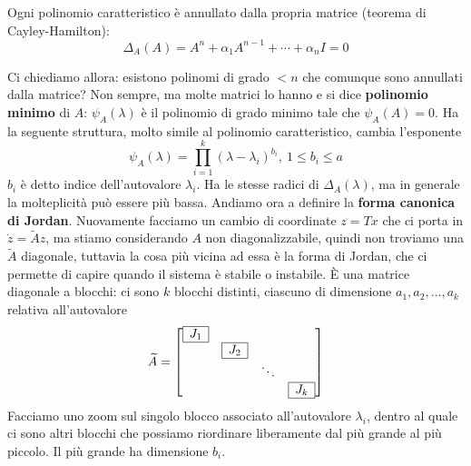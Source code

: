 \begin{rem}
	Ogni polinomio caratteristico è annullato dalla propria matrice (teorema di Cayley-Hamilton):\begin{equation*}
	\Delta _A\left(A\right) =A^n +\alpha _1 A^{n-1} +\cdots +\alpha _n I=0
	\end{equation*}
\end{rem}
Ci chiediamo allora: esistono polinomi di grado $< n$ che comunque sono annullati dalla matrice? Non sempre, ma molte matrici lo hanno e si dice \textbf{polinomio minimo} di $A$: $\psi _A\left(\lambda \right)$ è il polinomio di grado minimo tale che $\psi _A\left(A\right) =0$. Ha la seguente struttura, molto simile al polinomio caratteristico, cambia l'esponente
\begin{equation}
	\psi _A\left(\lambda \right) =\prod ^k_{i=1}\left(\lambda -\lambda _i\right)^{b_i} ,\ 1\leq b_i \leq a
\end{equation}
$b_i$ è detto indice dell'autovalore $\lambda _i$. Ha le stesse radici di $\Delta _A\left(\lambda \right)$, ma in generale la molteplicità può essere più bassa. Andiamo ora a definire la \textbf{forma canonica di Jordan}. Nuovamente facciamo un cambio di coordinate $z=Tx$ che ci porta in $\dot{z} =\tilde{A} z$, ma stiamo considerando $A$ non diagonalizzabile, quindi non troviamo una $\tilde{A}$ diagonale, tuttavia la cosa più vicina ad essa è la forma di Jordan, che ci permette di capire quando il sistema è stabile o instabile. È una matrice diagonale a blocchi: ci sono $k$ blocchi distinti, ciascuno di dimensione $a_1 ,a_2 ,\dotsc ,a_k$ relativa all'autovalore
\begin{equation*}
	\tilde{A} =\begin{bmatrix}
	\begin{array}{|c|}
		\hline 
		J_1    \\
		\hline 
	\end{array} &  &  & \\
	& \begin{array}{|c|}
	\hline
	J_2\\
	\hline
	\end{array} &  & \\
	&  & \ddots  & \\
	&  &  & \begin{array}{|c|}
	\hline
	J_k\\
	\hline
	\end{array}
	\end{bmatrix}
\end{equation*}
Facciamo uno zoom sul singolo blocco associato all'autovalore $\lambda _i$, dentro al quale ci sono altri blocchi che possiamo riordinare liberamente dal più grande al più piccolo. Il più grande ha dimensione $b_i$.
